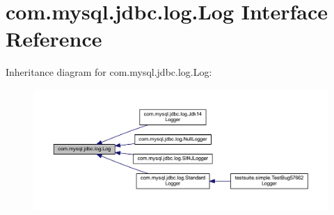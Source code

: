 \hypertarget{interfacecom_1_1mysql_1_1jdbc_1_1log_1_1_log}{}\section{com.\+mysql.\+jdbc.\+log.\+Log Interface Reference}
\label{interfacecom_1_1mysql_1_1jdbc_1_1log_1_1_log}


Inheritance diagram for com.\+mysql.\+jdbc.\+log.\+Log\+:
\nopagebreak
\begin{figure}[H]
\begin{center}
\leavevmode
\includegraphics[width=350pt]{interfacecom_1_1mysql_1_1jdbc_1_1log_1_1_log__inherit__graph}
\end{center}
\end{figure}
